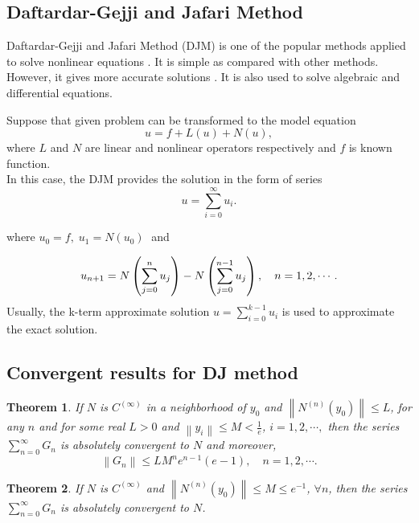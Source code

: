 \documentclass[12pt]{article}
\newtheorem{The}{Theorem}[section]
\numberwithin{equation}{section}
\begin{document}
\subsection{Daftardar-Gejji and Jafari Method}
Daftardar-Gejji and Jafari Method (DJM) is one of the popular methods applied to solve nonlinear equations \cite{GEJJI1}. It is simple as compared with other methods. However, it gives more accurate solutions \cite{GEJJI3,GEJJI4,GEJJI5,Mohyud,GEJJI6,GEJJI8,pb1,GEJJI7,GEJJI9}. It is also used to solve algebraic \cite{Noor} and differential  \cite{GEJJI10,GEJJI11,pb2} equations.
\par Suppose that given problem can be transformed to the model equation 
\begin{equation}
	u= f + L(u) + N(u),\label{1.1.1}
\end{equation}
where $L$ and $N$ are linear and nonlinear operators respectively and $f$ is known function.\\
In this case, the DJM provides the solution in the form of series 
\begin{equation}
	u= \sum_{i=0}^\infty u_i. \label{1.1.2}
\end{equation}

where $u_0=f,\; u_1=N(u_0)\;$ and 

\begin{equation}
u_{n+1} = N\left(\sum_{j=0}^n u_j\right)- N\left(\sum_{j=0}^{n-1} u_j\right), \quad n=1, 2, \cdots. \label{1.1.3} \\
\end{equation}
Usually, the k-term approximate solution $u= \sum_{i=0}^{k-1} u_i$ is used to approximate the exact solution.

\subsection{Convergent results for DJ method}
\begin{The}\cite{CONV}
If $N$ is $C^{(\infty)}$ in a neighborhood of $y_0$ and $\left\|N^{(n)}(y_0) \right\| \leq L$, for any $n$ and for some real $L>0$ and $\left\|y_i\right\| \leq M <\frac{1}{e}$, $i=1,2,\cdots,$ then the series $\sum_{n=0}^{\infty} G_n$ is absolutely convergent to $N$ and moreover,
\begin{equation*}
\left\|G_n\right\| \leq L M^n e^{n-1} (e-1), \quad n=1,2,\cdots.
\end{equation*}
\end{The}
 \begin{The}\cite{CONV}
 If $N$ is $C^{(\infty)}$ and $\left\|N^{(n)}(y_0) \right\| \leq M \leq e^{-1}$, $\forall n$, then the series $\sum_{n=0}^{\infty} G_n$ is absolutely convergent to $N$.
 \end{The}
\end{document}
